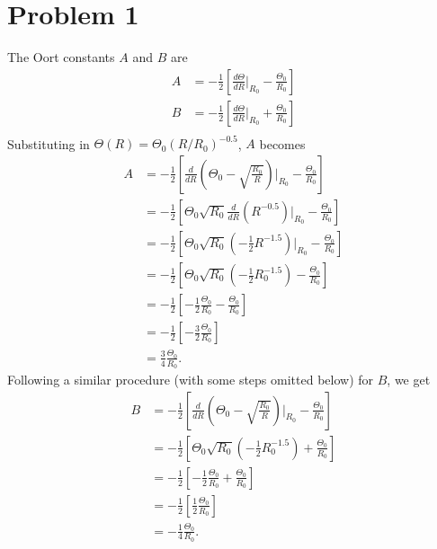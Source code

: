 \documentclass[11pt,letterpaper]{article}
\begin{document}
\section*{Problem 1}
        The Oort constants $A$ and $B$ are 
        \begin{align*}
            A &= -\frac{1}{2}\left[\frac{d\Theta}{dR}\Big|_{R_0} - \frac{\Theta_0}{R_0}\right] \\
            B &= -\frac{1}{2}\left[\frac{d\Theta}{dR}\Big|_{R_0} + \frac{\Theta_0}{R_0}\right] \\
        \end{align*}
        Substituting in $\Theta(R) = \Theta_0 (R/R_0)^{-0.5}$, $A$ becomes 
        \begin{align*}
            A &= -\frac{1}{2}\left[\frac{d}{dR}\left(\Theta_0 - \sqrt{\frac{R_0}{R}}\right)\Big|_{R_0} - \frac{\Theta_0}{R_0}\right] \\ 
            &= -\frac{1}{2}\left[\Theta_0 \sqrt{R_0}\frac{d}{dR}\left(R^{-0.5}\right)\Big|_{R_0} - \frac{\Theta_0}{R_0}\right] \\ 
            &= -\frac{1}{2}\left[\Theta_0 \sqrt{R_0}\left(-\frac{1}{2}R^{-1.5}\right)\Big|_{R_0} - \frac{\Theta_0}{R_0}\right] \\
            &= -\frac{1}{2}\left[\Theta_0 \sqrt{R_0}\left(-\frac{1}{2}R_0^{-1.5}\right) - \frac{\Theta_0}{R_0}\right] \\
            &= -\frac{1}{2}\left[-\frac{1}{2}\frac{\Theta_0}{R_0} - \frac{\Theta_0}{R_0}\right] \\ 
            &= -\frac{1}{2}\left[-\frac{3}{2}\frac{\Theta_0}{R_0}\right] \\
            &= \frac{3}{4}\frac{\Theta_0}{R_0}.
        \end{align*}
        Following a similar procedure (with some steps omitted below) for $B$, we get 
        \begin{align*}
            B &= -\frac{1}{2}\left[\frac{d}{dR}\left(\Theta_0 - \sqrt{\frac{R_0}{R}}\right)\Big|_{R_0} - \frac{\Theta_0}{R_0}\right] \\ 
            &= -\frac{1}{2}\left[\Theta_0 \sqrt{R_0}\left(-\frac{1}{2}R_0^{-1.5}\right) + \frac{\Theta_0}{R_0}\right] \\
            &= -\frac{1}{2}\left[-\frac{1}{2}\frac{\Theta_0}{R_0} + \frac{\Theta_0}{R_0}\right] \\ 
            &= -\frac{1}{2}\left[\frac{1}{2}\frac{\Theta_0}{R_0}\right] \\
            &= -\frac{1}{4}\frac{\Theta_0}{R_0}.
        \end{align*}
\end{document}
